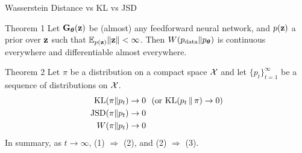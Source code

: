 \documentclass{beamer}
\begin{document}
\begin{frame}{Wasserstein Distance vs KL vs JSD}
	\begin{block}{Theorem 1}
		Let $\mathbf{G}_{\boldsymbol{\theta}}(\mathbf{z})$ be (almost) any feedforward neural network, and $p(\mathbf{z})$ a prior over $\mathbf{z}$ such that $\mathbb{E}_{p(\mathbf{z})} \|\mathbf{z}\| < \infty$. Then $W(p_{\text{data}} \| p_{\boldsymbol{\theta}})$ is continuous everywhere and differentiable almost everywhere.
	\end{block}
	\eqpause
	\begin{block}{Theorem 2}
		Let $\pi$ be a distribution on a compact space $\mathcal{X}$ and let $\{p_t\}_{t=1}^\infty$ be a sequence of distributions on $\mathcal{X}$. 
		\begin{align}
			\mathrm{KL}(\pi \| p_t) &\rightarrow 0 \ \ (\text{or }\mathrm{KL} (p_t\,\|\,\pi) \rightarrow 0) \\
			\mathrm{JSD}(\pi \| p_t) &\rightarrow 0 \\
			W(\pi \| p_t) &\rightarrow 0
		\end{align}
		In summary, as $t \rightarrow \infty$, (1) $\Rightarrow$ (2), and (2) $\Rightarrow$ (3).
	\end{block}
\end{frame}
\end{document}
